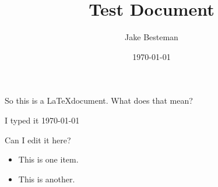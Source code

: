 \documentclass{article}
\begin{document}
\title{Test Document}
\author{Jake Besteman}
\date{\today}
\maketitle

\tableofcontents
\newpage
{}

So this is a \LaTeX document. What does that mean?

I typed it \today

Can I edit it here?

\begin{itemize}
\item This is one item.
\item This is another.
\end{itemize}
\end{document}
